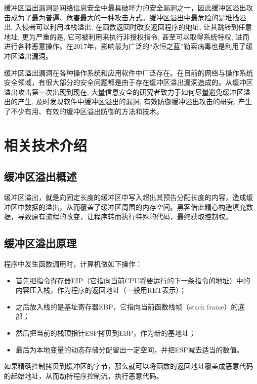 \documentclass[bachelor]{thesis-uestc}
\begin{document}
\thesistableofcontents

\thesischapterexordium %
缓冲区溢出漏洞是网络信息安全中最具破坏力的安全漏洞之一，因此缓冲区溢出攻击成为了最为普遍、危害最大的一种攻击方式。缓冲区溢出中最危险的是堆栈溢出, 入侵者可以利用堆栈溢出, 在函数返回时改变返回程序的地址, 让其跳转到任意地址, 更为严重的是, 它可被利用来执行非授权指令, 甚至可以取得系统特权, 进而进行各种恶意操作。在2017年，影响最为广泛的``永恒之蓝''勒索病毒也是利用了缓冲区溢出漏洞。\par
缓冲区溢出漏洞在各种操作系统和应用软件中广泛存在。在目前的网络与操作系统安全领域，有很大部分的安全问题都是由于存在缓冲区溢出漏洞造成的。从缓冲区溢出攻击第一次出现到现在, 大量信息安全的研究者致力于如何尽量避免缓冲区溢出的产生, 及时发现软件中缓冲区溢出的漏洞, 有效防御缓冲溢出攻击的研究, 产生了不少有用、有效的缓冲区溢出防御的方法和技术。

\chapter{相关技术介绍}
\section{缓冲区溢出概述}
缓冲区溢出，就是向固定长度的缓冲区中写入超出其预告分配长度的内容，造成缓冲区中数据的溢出，从而覆盖了缓冲区周围的内存空间。黑客借此精心构造填充数据，导致原有流程的改变，让程序转而执行特殊的代码，最终获取控制权。

\section{缓冲区溢出原理}
程序中发生函数调用时，计算机做如下操作：
\begin{itemize}
	\item 首先把指令寄存器EIP（它指向当前CPU将要运行的下一条指令的地址）中的内容压入栈，作为程序的返回地址（一般用RET表示）；
	\item 之后放入栈的是基址寄存器EBP，它指向当前函数栈帧（stack frame）的底部；
	\item 然后把当前的栈顶指针ESP拷贝到EBP，作为新的基地址；
	\item 最后为本地变量的动态存储分配留出一定空间，并把ESP减去适当的数值。
\end{itemize}
如果精确控制拷贝到缓冲区的字节，那么就可以将函数的返回地址覆盖成恶意代码的起始地址，从而劫持程序控制流，执行恶意代码。
\end{document}
